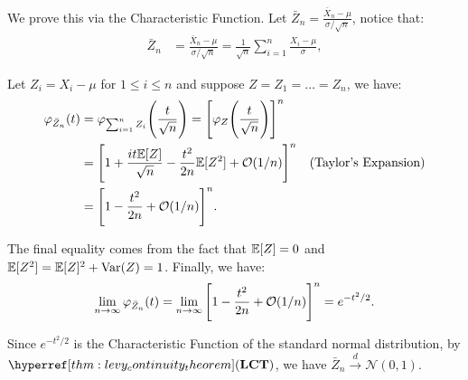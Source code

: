 \begin{proof*}
    We prove this via the Characteristic Function. Let $\bar Z_n = \frac{\bar X_n - \mu}{\sigma/\sqrt n}$, notice that:
    \begin{align*}
        \bar Z_n &= \frac{\bar X_n - \mu}{\sigma/\sqrt n} = \frac{1}{\sqrt n}\sum_{i=1}^n \frac{X_i - \mu}{\sigma},
    \end{align*}

    \noindent Let $Z_i = X_i - \mu$ for $1\le i \le n$ and suppose $Z = Z_1 = \dots = Z_n$, we have:
    \begin{align*}
        \varphi_{\bar Z_n}(t) &= \varphi_{\sum_{i=1}^n Z_i}\Bigg( \frac{t}{\sqrt n} \Bigg) = \Bigg[ 
            \varphi_Z\Bigg( \frac{t}{\sqrt n} \Bigg)
         \Bigg]^n \\
        &= \Bigg[ 
            1 + \frac{it\mathbb{E}[Z]}{\sqrt n} - \frac{t^2}{2n}\mathbb{E}[Z^2] + \mathcal{O}(1/n)
         \Bigg]^n \quad \text{(Taylor's Expansion)} \\
        &= \Bigg[ 
            1 - \frac{t^2}{2n} + \mathcal{O}(1/n)
         \Bigg]^n. 
    \end{align*}

    \noindent The final equality comes from the fact that $\mathbb{E}[Z] = 0$ and $\mathbb{E}[Z^2] = \mathbb{E}[Z]^2 + \mathrm{Var}(Z) = 1$. Finally, we have:
    \begin{align*}
        \lim_{n\to\infty}\varphi_{\bar Z_n}(t) = \lim_{n\to\infty} \Bigg[ 
            1 - \frac{t^2}{2n} + \mathcal{O}(1/n)
         \Bigg]^n = e^{-t^2/2}.
    \end{align*}

    \noindent Since $e^{-t^2/2}$ is the Characteristic Function of the standard normal distribution, by $\LCT$, we have $\bar Z_n \xrightarrow{d} \mathcal{N}(0,1)$.
\end{proof*}

